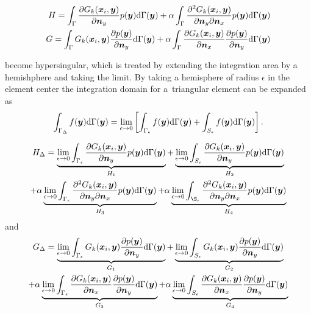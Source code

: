 \documentclass[a4paper, 10pt]{article}
\newcommand{\td}{\mathrm{d}}
\newcommand{\sx}{\bm{\mathnormal{x}}}
\newcommand{\sy}{\bm{\mathnormal{y}}}
\newcommand{\sn}{\bm{\mathnormal{n}}}
\newcommand{\bH}{\mathbf{H}}
\newcommand{\bG}{\mathbf{G}}
\newcommand{\limeps}{\lim\limits_{\epsilon \rightarrow 0}}
\begin{document}
\begin{align}
	H = \int_{\Gamma}\frac{\partial{G}_k (\sx_i, \sy)}{\partial \sn_y} p(\sy) \td \Gamma(\sy)
	+ \alpha \int_\Gamma \frac{\partial^2{G}_k (\sx_i, \sy)}{\partial \sn_y \partial \sn_x} p(\sy) \td \Gamma(\sy) \nonumber \\
	G = \int_{\Gamma} G_k(\sx_i,\sy) \frac{\partial p(\sy)}{\partial \sn_y} \td \Gamma(\sy)
	+ \alpha \int_\Gamma \frac{\partial{G}_k (\sx_i, \sy)}{\partial \sn_x} \frac{\partial p(\sy)}{\partial \sn_y}  \td \Gamma(\sy)
\end{align}

become hypersingular, which is treated by extending the integration area by a hemishphere and taking the limit.
By taking a hemisphere of radius $\epsilon$ in the element center the integration domain for a~triangular element can be expanded as
%
\begin{align}
	\int_{\Gamma_\Delta} f(\sy)\td\Gamma(\sy) = \lim\limits_{\epsilon \rightarrow 0 }\left[\int_{\Gamma_\epsilon} f(\sy) \td \Gamma(\sy) + \int_{S_{\epsilon}} f(\sy) \td \Gamma (\sy) \right] .
\end{align}
%

%
\begin{multline}
	H_\Delta
	=
	\underbrace{\limeps \int_{\Gamma_\epsilon}\frac{\partial{G}_k (\sx_i, \sy)}{\partial \sn_y} p(\sy) \td \Gamma(\sy)}_{H_1}
    +
	\underbrace{\limeps \int_{S_\epsilon}\frac{\partial{G}_k (\sx_i, \sy)}{\partial \sn_y} p(\sy) \td \Gamma(\sy) \nonumber}_{H_2} \\
	+
	\alpha \underbrace{\limeps \int_{\Gamma_\epsilon} \frac{\partial^2{G}_k (\sx_i, \sy)}{\partial \sn_y \partial \sn_x} p(\sy) \td \Gamma(\sy)}_{H_3} 
    +
	\alpha \underbrace{\limeps \int_{\S_\epsilon} \frac{\partial^2{G}_k (\sx_i, \sy)}{\partial \sn_y \partial \sn_x} p(\sy) \td \Gamma(\sy)}_{H_4}
\end{multline}
%
and
%
\begin{multline}
	G_\Delta
	=
	\underbrace{\limeps \int_{\Gamma_\epsilon} G_k(\sx_i,\sy) \frac{\partial p(\sy)}{\partial \sn_y}\td \Gamma(\sy)}_{G_1}
	+
	\underbrace{\limeps \int_{S_\epsilon} G_k(\sx_i, \sy) \frac{\partial p(\sy)}{\partial \sn_y} \td \Gamma(\sy) \nonumber}_{G_2} \\
	+
	\alpha \underbrace{\limeps \int_{\Gamma_\epsilon} \frac{\partial{G}_k (\sx_i, \sy)}{\partial \sn_x} \frac{\partial p(\sy)}{\partial \sn_y} \td \Gamma(\sy)}_{G_3}
	+
	\alpha \underbrace{\limeps \int_{S_\epsilon} \frac{\partial{G}_k (\sx_i, \sy)}{\partial \sn_x} \frac{\partial p(\sy)}{\partial \sn_y} \td \Gamma(\sy)}_{G_4}
\end{multline}
\end{document}
